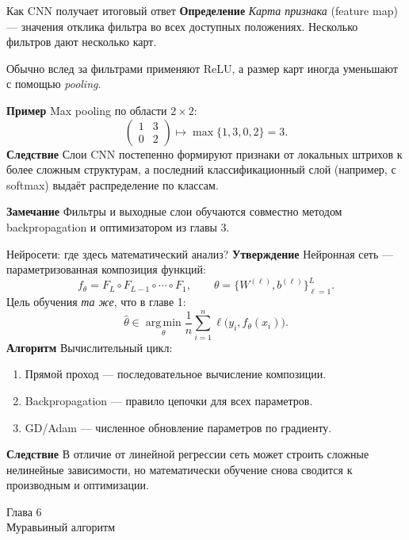 \documentclass[10pt]{beamer}
\newcommand{\dblue}[1]{\textcolor{defblue}{#1}}
\newcommand{\chapterframe}[2]{%
    \begin{frame}
        \vfill
        \begin{center}
            {\Large \dblue{Глава #1}}\\[0.65em]
            {\LARGE #2}
        \end{center}
        \vfill
    \end{frame}
}
\newcommand{\mlBody}{\normalsize}
\newcommand{\mlDefinition}{\textcolor{defblue}{\bfseries Определение}}
\newcommand{\mlStatement}{\textcolor{defblue}{\bfseries Утверждение}}
\newcommand{\mlRemark}{\textcolor{defblue}{\bfseries Замечание}}
\newcommand{\mlConsequence}{\textcolor{defblue}{\bfseries Следствие}}
\newcommand{\mlExample}{\textcolor{defblue}{\bfseries Пример}}
\newcommand{\mlAlgorithm}{\textcolor{defblue}{\bfseries Алгоритм}}
\begin{document}
\begin{frame}{Как CNN получает итоговый ответ}
\mlBody
\mlDefinition\; \textit{Карта признака} (feature map) --- значения отклика фильтра во всех доступных положениях. Несколько фильтров дают несколько карт.

Обычно вслед за фильтрами применяют ReLU, а размер карт иногда уменьшают с помощью \textit{pooling}.

\mlExample\; Max pooling по области $2\times2$:
\[
 \begin{pmatrix}1&3\\0&2\end{pmatrix}
 \longmapsto \max\{1,3,0,2\}=3.
\]
\mlConsequence\; Слои CNN постепенно формируют признаки от локальных штрихов к более сложным структурам, а последний классификационный слой (например, с softmax) выдаёт распределение по классам.

\mlRemark\; Фильтры и выходные слои обучаются совместно методом backpropagation и оптимизатором из главы 3.
\end{frame}


\begin{frame}{Нейросети: где здесь математический анализ?}
\mlBody
\mlStatement\; Нейронная сеть --- параметризованная композиция функций:
\[
 f_\theta=F_L\circ F_{L-1}\circ\cdots\circ F_1,
 \qquad \theta=\{W^{(\ell)},b^{(\ell)}\}_{\ell=1}^{L}.
\]
Цель обучения \emph{та же}, что в главе 1:
\[
 \hat\theta\in\operatorname*{arg\,min}_\theta
 \frac1n\sum_{i=1}^{n}\ell\bigl(y_i,f_\theta(x_i)\bigr).
\]
\mlAlgorithm\; Вычислительный цикл:
\begin{enumerate}
 \item Прямой проход --- последовательное вычисление композиции.
 \item Backpropagation --- правило цепочки для всех параметров.
 \item GD/Adam --- численное обновление параметров по градиенту.
\end{enumerate}
\mlConsequence\; В отличие от линейной регрессии сеть может строить
сложные нелинейные зависимости, но математически обучение снова
сводится к производным и оптимизации.
\end{frame}

\chapterframe{6}{Муравьиный алгоритм}
\end{document}
